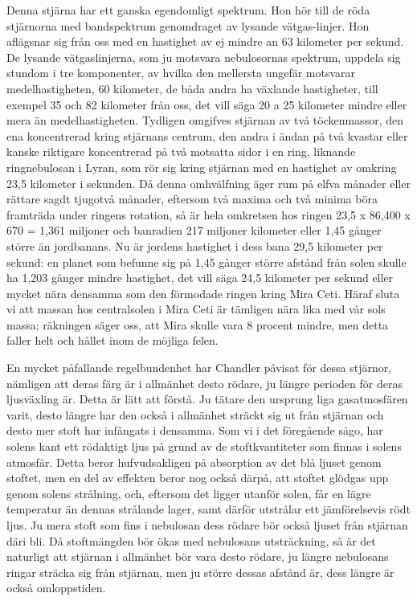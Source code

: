 \documentclass[a4paper, 12pt, oneside, swedish]{article}
\begin{document}
Denna stjärna har ett ganska egendomligt spektrum. Hon hör till de röda stjärnorna med bandspektrum genomdraget av lysande vätgas-linjer. Hon aflägsnar sig från oss med en hastighet av ej mindre an 63 kilometer per sekund. De lysande vätgaslinjerna, som ju motsvara nebulosornas spektrum, uppdela sig stundom i tre komponenter, av hvilka den mellersta ungefär motsvarar medelhastigheten, 60 kilometer, de båda andra ha växlande hastigheter, till exempel 35 och 82 kilometer från oss, det vill säga 20 a 25 kilometer mindre eller mera än medelhastigheten. Tydligen omgifves stjärnan av två töckenmassor, den ena koncentrerad kring stjärnans centrum, den andra i ändan på två kvastar eller kanske riktigare koncentrerad på två motsatta sidor i en ring, liknande ringnebulosan i Lyran, som rör sig kring stjärnan med en hastighet av omkring 23,5 kilometer i sekunden. Då denna omhvälfning äger rum på elfva månader eller rättare sagdt tjugotvå månader, eftersom två maxima och två minima böra framträda under ringens rotation, så är hela omkretsen hos ringen 23,5 x 86,400 x 670 = 1,361 miljoner och banradien 217 miljoner kilometer eller 1,45 gånger större än jordbanans. Nu är jordens hastighet i dess bana 29,5 kilometer per sekund: en planet som befunne sig på 1,45 gånger större afstånd från solen skulle ha 1,203 gånger mindre hastighet, det vill säga 24,5 kilometer per sekund eller mycket nära densamma som den förmodade ringen kring Mira Ceti. Häraf sluta vi att massan hos centralsolen i Mira Ceti är tämligen nära lika med vår sols massa; räkningen säger oss, att Mira skulle vara 8 procent mindre, men detta faller helt och hållet inom de möjliga felen.

En mycket påfallande regelbundenhet har Chandler påvisat för dessa stjärnor, nämligen att deras färg är i allmänhet desto rödare, ju längre perioden för deras ljusväxling är. Detta är lätt att förstå. Ju tätare den ursprung liga gasatmosfären varit, desto längre har den också i allmänhet sträckt sig ut från stjärnan och desto mer stoft har infångats i densamma. Som vi i det föregående sågo, har solens kant ett rödaktigt ljus på grund av de stoftkvantiteter som finnas i solens atmosfär. Detta beror hufvudsakligen på absorption av det blå ljuset genom stoftet, men en del av effekten beror nog också därpå, att stoftet glödgas upp genom solens strålning, och, eftersom det ligger utanför solen, får en lägre temperatur än dennas strålande lager, samt därför utstrålar ett jämförelsevis rödt ljus. Ju mera stoft som fins i nebulosan dess rödare bör också ljuset från stjärnan däri bli. Då stoftmängden bör ökas med nebulosans utsträckning, så är det naturligt att stjärnan i allmänhet bör vara desto rödare, ju längre nebulosans ringar sträcka sig från stjärnan, men ju större dessas afstånd är, dess längre är också omloppstiden.
\end{document}
